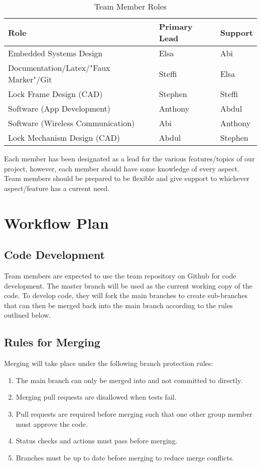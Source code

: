 \documentclass{article}
\begin{document}
\begin{table}[h]
\caption{Team Member Roles} \label{TblTeamMemberRoles}
\begin{tabularx}{\textwidth}{llX}
\toprule
\textbf{Role} & \textbf{Primary Lead} & \textbf{Support}\\
\midrule
Embedded Systems Design & Elsa & Abi\\
Documentation/Latex/"Faux Marker"/Git & Steffi & Elsa\\
Lock Frame Design (CAD) & Stephen & Steffi\\
Software (App Development) & Anthony & Abdul\\
Software (Wireless Communication) & Abi & Anthony\\
Lock Mechanism Design (CAD) & Abdul & Stephen\\
\bottomrule
\end{tabularx}
\end{table}

Each member has been designated as a lead for the various features/topics of our project, however, each member should have some knowledge of every aspect.  Team members should be prepared to be flexible and give support to whichever aspect/feature has a current need. 

\section{Workflow Plan}

\subsection{Code Development}

Team members are expected to use the team repository on Github for code development. The master branch will be used as the current working copy of the code. To develop code, they will fork the main branches to create sub-branches that can then be merged back into the main branch according to the rules outlined below. 

\subsection{Rules for Merging}

Merging will take place under the following branch protection rules: 

\begin{enumerate}

\item The main branch can only be merged into and not committed to directly. 
\item Merging pull requests are disallowed when tests fail. 
\item Pull requests are required before merging such that one other group member must approve the code. 
\item Status checks and actions must pass before merging. 
\item Branches must be up to date before merging to reduce merge conflicts. 

\end{enumerate} 
\end{document}
